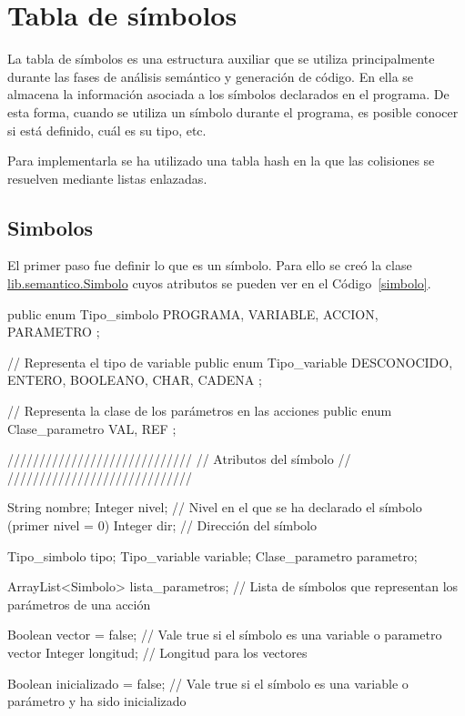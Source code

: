 \section{Tabla de símbolos}
\label{tabla}

La tabla de símbolos es una estructura auxiliar que se utiliza principalmente durante las fases de análisis semántico y generación de código. En ella se almacena la información asociada a los símbolos declarados en el programa. De esta forma, cuando se utiliza un símbolo durante el programa, es posible conocer si está definido, cuál es su tipo, etc.

Para implementarla se ha utilizado una tabla hash en la que las colisiones se resuelven mediante listas enlazadas.

\subsection{Simbolos}
El primer paso fue definir lo que es un símbolo. Para ello se creó la clase \url{lib.semantico.Simbolo} cuyos atributos se pueden ver en el Código~\ref{simbolo}.

\begin{codigo}[style=java,caption={Atributos de la clase \url{lib.semantico.Simbolo}.},label={simbolo}]
public enum Tipo_simbolo {
    PROGRAMA, VARIABLE, ACCION, PARAMETRO
};

// Representa el tipo de variable
public enum Tipo_variable {
    DESCONOCIDO, ENTERO, BOOLEANO, CHAR, CADENA
};

// Representa la clase de los parámetros en las acciones
public enum Clase_parametro {
    VAL, REF
};

/////////////////////////////
// Atributos del símbolo //
/////////////////////////////

String nombre;
Integer nivel; // Nivel en el que se ha declarado el símbolo (primer nivel = 0)
Integer dir; // Dirección del símbolo

Tipo_simbolo tipo;
Tipo_variable variable;
Clase_parametro parametro;

ArrayList<Simbolo> lista_parametros; // Lista de símbolos que representan los parámetros de una acción

Boolean vector = false; // Vale true si el símbolo es una variable o parametro vector
Integer longitud; // Longitud para los vectores

Boolean inicializado = false; // Vale true si el símbolo es una variable o parámetro y ha sido inicializado
\end{codigo}

